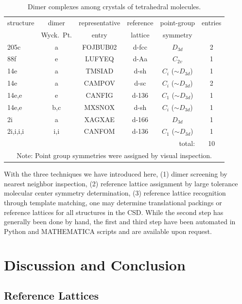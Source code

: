 \documentclass[preprint]{iucr}              %
\begin{document}
\begin{table}
\begin{center}
\caption{Dimer complexes among crystals of tetrahedral
molecules.}\label{tab:dimers}
\begin{tabular}{lccccc}
\hline
structure & dimer & representative & reference & point-group & entries\\
          &Wyck.~Pt.& entry        & lattice   & symmetry \\
\hline
205c & a & FOJBUB02 & d-fcc & $D_{3d}$              & 2\\
88f  & e & LUFYEQ   & d-Aa  & $C_{2v}$              & 1\\
14e  & a & TMSIAD   & d-sh  & $C_i$ ($\sim D_{3d}$) & 1 \\
14e  & a & CAMPOV   & d-sc  & $C_i$ ($\sim D_{3d}$) & 2\\
14e,e& e & CANFIG   & d-136 & $C_1$ ($\sim D_{3d}$) & 1\\
14e,e&b,c& MXSNOX   & d-sh  & $C_i$ ($\sim D_{3d}$) & 1\\
2i   & a & XAGXAE   & d-166 & $D_{3d}$              & 1\\
2i,i,i,i&i,i&CANFOM & d-136 & $C_1$ ($\sim D_{3d}$) & 1 \\
\cline{6-6}
\multicolumn{5}{r}{total:} & 10 \\
\hline \multicolumn{6}{c}{{\small Note: Point group symmetries were
assigned by visual inspection.}}
\end{tabular}
\end{center}
\end{table}

With the three techniques we have introduced here, (1) dimer
screening by nearest neighbor inspection, (2) reference lattice
assignment by large tolerance molecular center symmetry
determination, (3) reference lattice recognition through template
matching, one may determine translational packings or reference
lattices for all structures in the CSD.  While the second step has
generally been done by hand, the first and third step have been
automated in Python and {M\small ATHEMATICA} scripts and are
available upon request.

\section{Discussion and Conclusion}
\label{discussion}

\subsection{Reference Lattices}
\end{document}
